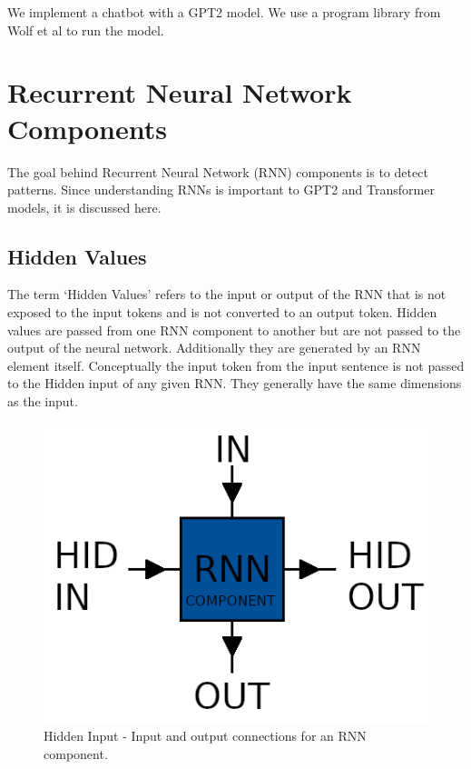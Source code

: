 We implement a chatbot with a GPT2 model. We use a program library from Wolf et al \cite{Wolf2019HuggingFacesTS} to run the model.


\section{Recurrent Neural Network Components}

The goal behind Recurrent Neural Network (RNN) components is to detect patterns. Since understanding RNNs is important to GPT2 and Transformer models, it is discussed here. %

\subsection{Hidden Values}
The term `Hidden Values' refers to the input or output of the RNN that is not exposed to the input tokens and is not converted to an output token. Hidden values are passed from one RNN component to another but are not passed to the output of the neural network. Additionally they are generated by an RNN element itself. Conceptually the input token from the input sentence is not passed to the Hidden input of any given RNN. They generally have the same dimensions as the input.

\begin{figure}[H]
	\begin{center}
		
		\includegraphics[scale=2.0]{diagram-hidden}
		
	\end{center}
	\caption[Hidden Input]{Hidden Input - Input and output connections for an RNN component.}
	\label{diagram-hidden}
	
\end{figure}


